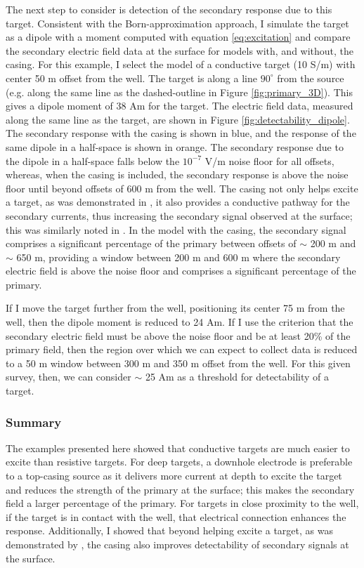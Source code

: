 The next step to consider is detection of the secondary response due to this target. Consistent with the Born-approximation approach, I simulate the target as a dipole with a moment computed with equation \ref{eq:excitation} and compare the secondary electric field data at the surface for models with, and without, the casing. For this example, I select the model of a conductive target (10 S/m) with center 50 m offset from the well. The target is along a line $90^\circ$ from the source (e.g. along the same line as the dashed-outline in Figure \ref{fig:primary_3D}). This gives a dipole moment of 38 Am for the target. The electric field data, measured along the same line as the target, are shown in Figure \ref{fig:detectability_dipole}. The secondary response with the casing is shown in blue, and the response of the same dipole in a half-space is shown in orange. The secondary response due to the dipole in a half-space falls below the $10^{-7}$ V/m noise floor for all offsets, whereas, when the casing is included, the secondary response is above the noise floor until beyond offsets of 600 m from the well. The casing not only helps excite a target, as was demonstrated in \cite{Schenkel1994}, it also provides a conductive pathway for the secondary currents, thus increasing the secondary signal observed at the surface; this was similarly noted in \cite{Yang2016}. In the model with the casing, the secondary signal comprises a significant percentage of the primary between offsets of $\sim$ 200 m and $\sim$ 650 m, providing a window between 200 m and 600 m where the secondary electric field is above the noise floor and comprises a significant percentage of the primary.

If I move the target further from the well, positioning its center 75 m from the well, then the dipole moment is reduced to 24 Am. If I use the criterion that the secondary electric field must be above the noise floor and be at least 20\% of the primary field, then the region over which we can expect to collect data is reduced to a 50 m window between 300 m and 350 m offset from the well. For this given survey, then, we can consider $\sim$ 25 Am as a threshold for detectability of a target.





\subsubsection{Summary}
The examples presented here showed that conductive targets are much easier to excite than resistive targets. For deep targets, a downhole electrode is preferable to a top-casing source as it delivers more current at depth to excite the target and reduces the strength of the primary at the surface; this makes the secondary field a larger percentage of the primary. For targets in close proximity to the well, if the target is in contact with the well, that electrical connection enhances the response. Additionally, I showed that beyond helping excite a target, as was demonstrated by \cite{Schenkel1994}, the casing also improves detectability of secondary signals at the surface.

